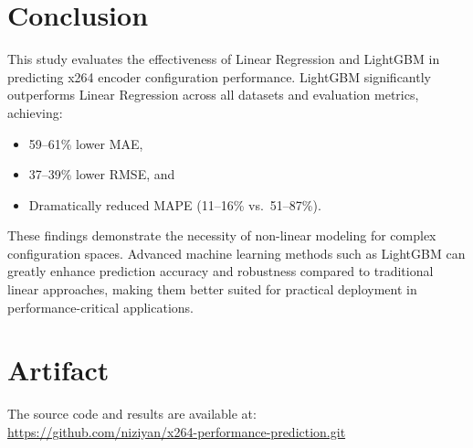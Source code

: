 \documentclass[10pt]{article}
\begin{document}
\section{Conclusion}
This study evaluates the effectiveness of Linear Regression and LightGBM in predicting x264 encoder configuration performance. LightGBM significantly outperforms Linear Regression across all datasets and evaluation metrics, achieving:

\begin{itemize}
    \item 59--61\% lower MAE,
    \item 37--39\% lower RMSE, and
    \item Dramatically reduced MAPE (11--16\% vs.\ 51--87\%).
\end{itemize}

These findings demonstrate the necessity of non-linear modeling for complex configuration spaces. Advanced machine learning methods such as LightGBM can greatly enhance prediction accuracy and robustness compared to traditional linear approaches, making them better suited for practical deployment in performance-critical applications.

\section{Artifact}
The source code and results are available at: \\ \url{https://github.com/niziyan/x264-performance-prediction.git}
\end{document}
